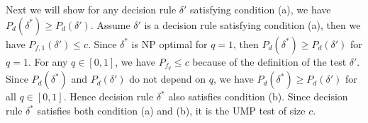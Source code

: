 Next we will show for any decision rule $\delta'$ satisfying condition (a), we have $P_d(\delta^\ast) \geq P_d(\delta')$.  
Assume $\delta'$ is a decision rule satisfying condition (a), then we have  $P_{f,1}(\delta') \leq c$.
Since $\delta^\ast$ is NP optimal for $q=1$, then $P_d(\delta^\ast)\geq P_d(\delta')$ for $q =1$.
For any $q \in [0, 1]$, we have $P_{f_q} \leq c$ because of the definition of the test $\delta'$. Since $P_d(\delta^\ast)$ and $P_d(\delta')$ do not depend on $q$, we have $P_d(\delta^\ast) \geq P_d(\delta')$ for all $q \in [0, 1]$.
Hence decision rule $\delta^\ast$ also satisfies condition (b). Since decision rule $\delta^\ast$ satisfies both condition (a) and (b), it is the UMP test of size $c$.    



